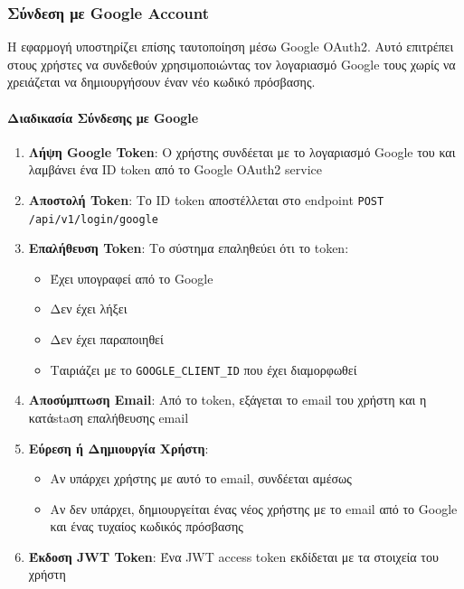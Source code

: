 \documentclass[12pt,a4paper]{report}
\begin{document}
\subsubsection{Σύνδεση με Google Account}

Η εφαρμογή υποστηρίζει επίσης ταυτοποίηση μέσω Google OAuth2. Αυτό επιτρέπει στους χρήστες να συνδεθούν χρησιμοποιώντας τον λογαριασμό Google τους χωρίς να χρειάζεται να δημιουργήσουν έναν νέο κωδικό πρόσβασης.

\paragraph{Διαδικασία Σύνδεσης με Google}

\begin{enumerate}
    \item \textbf{Λήψη Google Token}: Ο χρήστης συνδέεται με το λογαριασμό Google του και λαμβάνει ένα ID token από το Google OAuth2 service
    
    \item \textbf{Αποστολή Token}: Το ID token αποστέλλεται στο endpoint \texttt{POST /api/v1/login/google}
    
    \item \textbf{Επαλήθευση Token}: Το σύστημα επαληθεύει ότι το token:
    \begin{itemize}
        \item Έχει υπογραφεί από το Google
        \item Δεν έχει λήξει
        \item Δεν έχει παραποιηθεί
        \item Ταιριάζει με το \texttt{GOOGLE\_CLIENT\_ID} που έχει διαμορφωθεί
    \end{itemize}
    
    \item \textbf{Αποσύμπτωση Email}: Από το token, εξάγεται το email του χρήστη και η κατάstaση επαλήθευσης email
    
    \item \textbf{Εύρεση ή Δημιουργία Χρήστη}:
    \begin{itemize}
        \item Αν υπάρχει χρήστης με αυτό το email, συνδέεται αμέσως
        \item Αν δεν υπάρχει, δημιουργείται ένας νέος χρήστης με το email από το Google και ένας τυχαίος κωδικός πρόσβασης
    \end{itemize}
    
    \item \textbf{Έκδοση JWT Token}: Ένα JWT access token εκδίδεται με τα στοιχεία του χρήστη
\end{enumerate}
\end{document}

